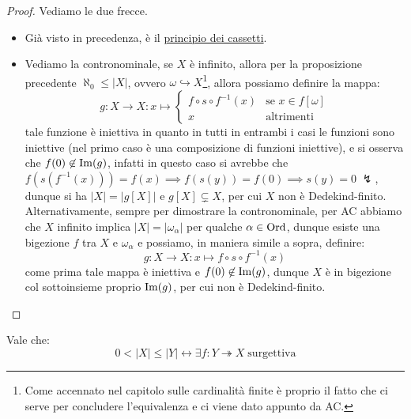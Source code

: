\begin{proof}
	Vediamo le due frecce.
	\begin{itemize}
		\item[$\boxed{\rightarrow}$] Gi\`a visto in precedenza, \`e il \hyperref[cassetti]{principio dei cassetti}.
		\item[$\boxed{\leftarrow}$] Vediamo la contronominale, se $X$ \`e infinito, allora per la proposizione precedente $\aleph_0 \leq |X|$, ovvero $\omega \hookrightarrow X$\footnote{Come accennato nel capitolo sulle cardinalit\`a finite \`e proprio il fatto che ci serve per concludere l'equivalenza e ci viene dato appunto da AC.}, allora possiamo definire la mappa:
		\[ g : X \rightarrow X : x \mapsto \begin{cases}
			f \circ s \circ f^{-1} (x) &\text{se $x \in f[\omega]$} \\
			x &\text{altrimenti}
		\end{cases}
			\]
		tale funzione \`e iniettiva in quanto in tutti in entrambi i casi le funzioni sono iniettive (nel primo caso \`e una composizione di funzioni iniettive), e si osserva che $f(0) \not \in \operatorname{Im}(g)$, infatti in questo caso si avrebbe che $f(s(f^{-1}(x))) = f(x) \implies f(s(y)) = f(0) \implies s(y) = 0 \; \lightning$, dunque si ha $|X| = |g[X]|$ e $g[X] \subsetneq X$, per cui $X$ non \`e Dedekind-finito.\\
		Alternativamente, sempre per dimostrare la contronominale, per AC abbiamo che $X$ infinito implica $|X| = |\omega_\alpha|$ per qualche $\alpha \in \operatorname{Ord}$, dunque esiste una bigezione $f$ tra $X$ e $\omega_\alpha$ e possiamo, in maniera simile a sopra, definire:
		\[ g : X \to X : x \mapsto f \circ s \circ f^{-1}(x)
			\]
		come prima tale mappa \`e iniettiva e $f(0) \not \in \operatorname{Im}(g)$, dunque $X$ \`e in bigezione col sottoinsieme proprio $\operatorname{Im}(g)$, per cui non \`e Dedekind-finito.
	\end{itemize}
\end{proof}

\begin{proposition}
	Vale che:
	\[ 0 < |X| \leq |Y| \leftrightarrow \exists f : Y \twoheadrightarrow X \; \text{surgettiva}
		\]
\end{proposition}

